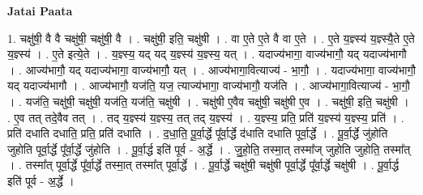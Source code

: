 \documentclass[17pt]{extarticle}
\begin{document}
\textbf{Jatai Paata} \newline

1. चक्षु॑षी॒ वै वै चक्षु॑षी॒ चक्षु॑षी॒ वै । . चक्षु॑षी॒ इति॒ चक्षु॑षी । . वा ए॒ते ए॒ते वै वा ए॒ते । . ए॒ते य॒ज्ञ्स्य॑ य॒ज्ञ्स्यै॒ते ए॒ते य॒ज्ञ्स्य॑ । . ए॒ते इत्ये॒ते । . य॒ज्ञ्स्य॒ यद् यद् य॒ज्ञ्स्य॑ य॒ज्ञ्स्य॒ यत् । . यदाज्य॑भागा॒ वाज्य॑भागौ॒ यद् यदाज्य॑भागौ । . आज्य॑भागौ॒ यद् यदाज्य॑भागा॒ वाज्य॑भागौ॒ यत् । . आज्य॑भागा॒वित्याज्य॑ - भा॒गौ॒ । . यदाज्य॑भागा॒ वाज्य॑भागौ॒ यद् यदाज्य॑भागौ । . आज्य॑भागौ॒ यज॑ति॒ यज॒ त्याज्य॑भागा॒ वाज्य॑भागौ॒ यज॑ति । . आज्य॑भागा॒वित्याज्य॑ - भा॒गौ॒ । . यज॑ति॒ चक्षु॑षी॒ चक्षु॑षी॒ यज॑ति॒ यज॑ति॒ चक्षु॑षी । . चक्षु॑षी ए॒वैव चक्षु॑षी॒ चक्षु॑षी ए॒व । . चक्षु॑षी॒ इति॒ चक्षु॑षी । . ए॒व तत् तदे॒वैव तत् । . तद् य॒ज्ञ्स्य॑ य॒ज्ञ्स्य॒ तत् तद् य॒ज्ञ्स्य॑ । . य॒ज्ञ्स्य॒ प्रति॒ प्रति॑ य॒ज्ञ्स्य॑ य॒ज्ञ्स्य॒ प्रति॑ । . प्रति॑ दधाति दधाति॒ प्रति॒ प्रति॑ दधाति । . द॒धा॒ति॒ पू॒र्वा॒र्द्धे पू᳚र्वा॒र्द्धे द॑धाति दधाति पूर्वा॒र्द्धे । . पू॒र्वा॒र्द्धे जु॑होति जुहोति पूर्वा॒र्द्धे पू᳚र्वा॒र्द्धे जु॑होति । . पू॒र्वा॒र्द्ध इति॑ पूर्व - अ॒र्द्धे । . जु॒हो॒ति॒ तस्मा॒त् तस्मा᳚ज् जुहोति जुहोति॒ तस्मा᳚त् । . तस्मा᳚त् पूर्वा॒र्द्धे पू᳚र्वा॒र्द्धे तस्मा॒त् तस्मा᳚त् पूर्वा॒र्द्धे । . पू॒र्वा॒र्द्धे चक्षु॑षी॒ चक्षु॑षी पूर्वा॒र्द्धे पू᳚र्वा॒र्द्धे चक्षु॑षी । . पू॒र्वा॒र्द्ध इति॑ पूर्व - अ॒र्द्धे । \newline
\end{document}

